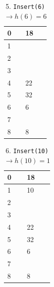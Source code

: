 \documentclass[11pt, letterpaper, titlepage]{article}
\begin{document}
\begin{enumerate}[label=\alph*)]
\begin{paracol}{2}
        \begin{table}[H]
            \small
            \centering
            \caption{5. \texttt{Insert(6)} $\rightarrow h(6) = 6$}
            \begin{tabular}{|m{3em}|m{7em}|}
                \hline
                0 & 18 \\ \hline
                1 &  \\ \hline
                2 &  \\ \hline
                3 &  \\ \hline
                4 & 22 \\ \hline
                5 & 32 \\ \hline
                6 & 6 \\ \hline
                7 &  \\ \hline
                8 & 8 \\ \hline
            \end{tabular}
        \end{table}

        \switchcolumn

        \begin{table}[H]
            \small
            \centering
            \caption{6. \texttt{Insert(10)} $\rightarrow h(10) = 1$}
            \begin{tabular}{|m{3em}|m{7em}|}
                \hline
                0 & 18 \\ \hline
                1 & 10 \\ \hline
                2 &  \\ \hline
                3 &  \\ \hline
                4 & 22 \\ \hline
                5 & 32 \\ \hline
                6 & 6 \\ \hline
                7 &  \\ \hline
                8 & 8 \\ \hline
            \end{tabular}
        \end{table}

        \switchcolumn


\end{paracol}
\end{enumerate}
\end{document}
